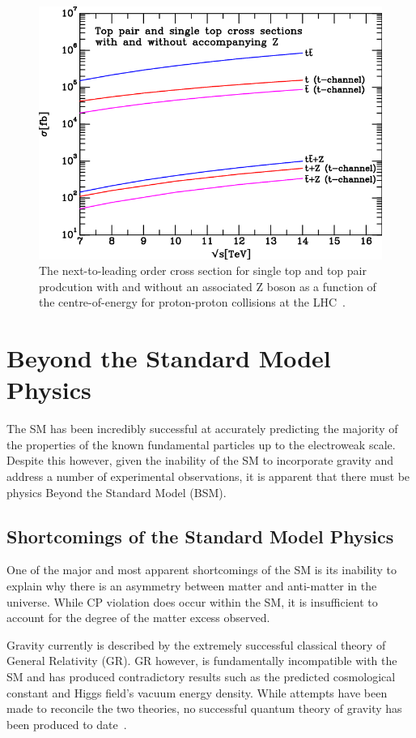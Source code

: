\begin{figure}[h]
\centering
\includegraphics{figs/top-physics/TplusZtot.png}
\caption{The next-to-leading order cross section for single top and top pair prodcution with and without an associated Z boson as a function of the centre-of-energy for proton-proton collisions at the LHC~\cite{Campbell:2013yla}.
}
\label{fig:topZcrossSections}
\end{figure}

\section{Beyond the Standard Model Physics}\label{sec:bsm}
The SM has been incredibly successful at accurately predicting the majority of the properties of the known fundamental particles up to the electroweak scale.
Despite this however, given the inability of the SM to incorporate gravity and address a number of experimental observations, it is apparent that there must be physics Beyond the Standard Model (BSM).

\subsection{Shortcomings of the Standard Model Physics}\label{subsec:shortcomings}
One of the major and most apparent shortcomings of the SM is its inability to explain why there is an asymmetry between matter and anti-matter in the universe.
While CP violation does occur within the SM, it is insufficient to account for the degree of the matter excess observed.

Gravity currently is described by the extremely successful classical theory of General Relativity (GR).
GR however, is fundamentally incompatible with the SM and  has produced contradictory results such as the predicted cosmological constant and Higgs field's vacuum energy density.
While attempts have been made to reconcile the two theories, no successful quantum theory of gravity has been produced to date~\cite{Sola:2013gha}.	

